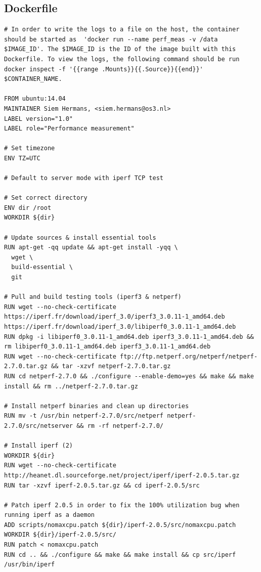 \begin{appendices}
  \renewcommand\thetable{\thesection\arabic{table}}
  \renewcommand\thefigure{\thesection\arabic{figure}}
  \section{Dockerfile} \label{app:dockerfile}
  \begin{lstlisting}
# In order to write the logs to a file on the host, the container should be started as  'docker run --name perf_meas -v /data $IMAGE_ID'. The $IMAGE_ID is the ID of the image built with this Dockerfile. To view the logs, the following command should be run docker inspect -f '{{range .Mounts}}{{.Source}}{{end}}' $CONTAINER_NAME.

FROM ubuntu:14.04
MAINTAINER Siem Hermans, <siem.hermans@os3.nl>
LABEL version="1.0"
LABEL role="Performance measurement"

# Set timezone
ENV TZ=UTC

# Default to server mode with iperf TCP test

# Set correct directory
ENV dir /root
WORKDIR ${dir}

# Update sources & install essential tools  
RUN apt-get -qq update && apt-get install -yqq \
  wget \
  build-essential \
  git

# Pull and build testing tools (iperf3 & netperf)
RUN wget --no-check-certificate https://iperf.fr/download/iperf_3.0/iperf3_3.0.11-1_amd64.deb https://iperf.fr/download/iperf_3.0/libiperf0_3.0.11-1_amd64.deb
RUN dpkg -i libiperf0_3.0.11-1_amd64.deb iperf3_3.0.11-1_amd64.deb && rm libiperf0_3.0.11-1_amd64.deb iperf3_3.0.11-1_amd64.deb
RUN wget --no-check-certificate ftp://ftp.netperf.org/netperf/netperf-2.7.0.tar.gz && tar -xzvf netperf-2.7.0.tar.gz
RUN cd netperf-2.7.0 && ./configure --enable-demo=yes && make && make install && rm ../netperf-2.7.0.tar.gz

# Install netperf binaries and clean up directories
RUN mv -t /usr/bin netperf-2.7.0/src/netperf netperf-2.7.0/src/netserver && rm -rf netperf-2.7.0/

# Install iperf (2)
WORKDIR ${dir}
RUN wget --no-check-certificate http://heanet.dl.sourceforge.net/project/iperf/iperf-2.0.5.tar.gz 
RUN tar -xzvf iperf-2.0.5.tar.gz && cd iperf-2.0.5/src

# Patch iperf 2.0.5 in order to fix the 100% utilization bug when running iperf as a daemon
ADD scripts/nomaxcpu.patch ${dir}/iperf-2.0.5/src/nomaxcpu.patch
WORKDIR ${dir}/iperf-2.0.5/src/
RUN patch < nomaxcpu.patch
RUN cd .. && ./configure && make && make install && cp src/iperf /usr/bin/iperf


\end{lstlisting}
\end{appendices}

